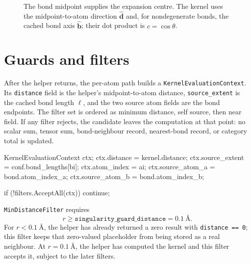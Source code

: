 \documentclass[11pt]{article}
\newcommand{\code}[1]{\texttt{#1}}
\begin{document}
\begin{figure}[ht]
\centering
{}
\caption{The bond midpoint supplies the expansion centre. The kernel uses the
midpoint-to-atom direction \(\hat{\bm d}\) and, for nondegenerate bonds, the
cached bond axis \(\hat{\bm b}\); their dot product is \(c=\cos\theta\).}
\end{figure}

\section{Guards and filters}

After the helper returns, the per-atom path builds a
\code{KernelEvaluationContext}. Its \code{distance} field is the helper's
midpoint-to-atom distance, \code{source\_extent} is the cached bond length
\(\ell\), and the two source atom fields are the bond endpoints. The filter set
is ordered as minimum distance, self source, then near field. If any filter
rejects, the candidate leaves the computation at that point: no scalar sum,
tensor sum, bond-neighbour record, nearest-bond record, or category total is
updated.

\begin{codebox}
KernelEvaluationContext ctx;
ctx.distance      = kernel.distance;
ctx.source_extent = conf.bond_lengths[bi];
ctx.atom_index    = ai;
ctx.source_atom_a = bond.atom_index_a;
ctx.source_atom_b = bond.atom_index_b;

if (!filters.AcceptAll(ctx)) continue;
\end{codebox}

\code{MinDistanceFilter} requires
\[
  r \ge \code{singularity\_guard\_distance} = \SI{0.1}{\angstrom}.
\]
For \(r<\SI{0.1}{\angstrom}\), the helper has already returned a zero result
with \code{distance == 0}; this filter keeps that zero-valued placeholder from
being stored as a real neighbour. At \(r=\SI{0.1}{\angstrom}\), the helper has
computed the kernel and this filter accepts it, subject to the later filters.
\end{document}
